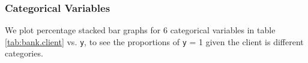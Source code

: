 \documentclass[11pt,a4paper]{article}
\begin{document}
    
    
    \subsubsection{Categorical Variables}



    
    We plot percentage stacked bar graphs for 6 categorical variables in table \ref{tab:bank.client} vs. \texttt{y}, to see the proportions of \texttt{y} = 1 given the client is different categories.
    
\end{document}
